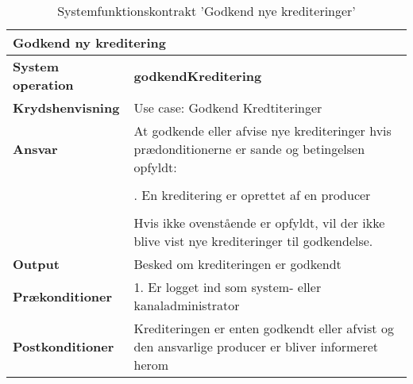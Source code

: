 \begin{table}[H]
    \begin{tabularx}{\textwidth}{|p{4cm}|X|}
        \hline
        \multicolumn{2}{|x|}{\textbf{Godkend ny kreditering}}\\
        \hline
        \textbf{System operation}       & \textbf{godkendKreditering} \\ \hline
        \textbf{Krydshenvisning}        & Use case: Godkend Kredtiteringer \\ \hline
        \textbf{Ansvar}                 & At godkende eller afvise nye krediteringer hvis prædonditionerne er sande og betingelsen opfyldt:  \\ 
                                        & \\
                                        & \quad 1. En kreditering er oprettet af en producer \\
                                        & \\
                                        & Hvis ikke ovenstående er opfyldt, vil der ikke blive vist nye krediteringer til godkendelse. \\ \hline
        \textbf{Output}                 & Besked om krediteringen er godkendt \\ \hline
        \textbf{Prækonditioner}         & 1. Er logget ind som system- eller kanaladministrator \\ \hline
        \textbf{Postkonditioner}        & Krediteringen er enten godkendt eller afvist og den ansvarlige producer er bliver informeret herom \\ \hline
    \end{tabularx}
    \caption{Systemfunktionskontrakt 'Godkend nye krediteringer'}
    \label{tab:kontrakter_Godkend_nye_krediteringer}
\end{table}